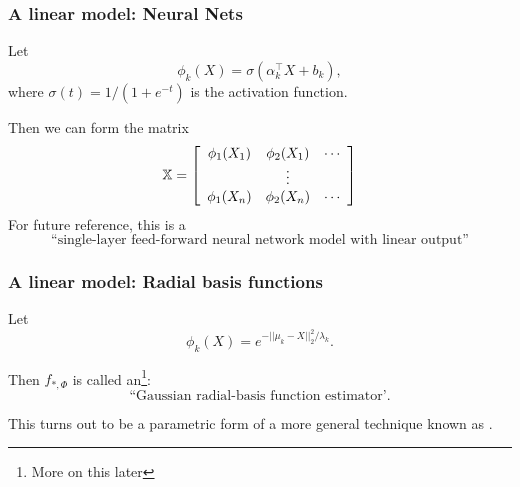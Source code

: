 \documentclass{beamer}
\begin{document}
\begin{frame}
\frametitle{A linear model: Neural Nets}
Let 
\[
\phi_k(X)  = \sigma(\alpha_k^{\top}X + b_k),
\]
where $\sigma(t) = 1/(1 + e^{-t})$ is the  activation function.
\vsp

Then we can form the  matrix
\[
\mathbb{X}
=
\left[
\begin{array}{ccc}
\phi_1(X_1) & \phi_2(X_1) & \cdots \\
& \vdots & \\
\phi_1(X_n) & \phi_2(X_n) & \cdots 
\end{array}
\right]
\]
For future reference, this is a
\[
\textrm{``single-layer feed-forward neural network model with linear output''} 
\]

\end{frame}


\begin{frame}
\frametitle{A linear model: Radial basis functions}
Let 
\[
\phi_k(X)  = e^{-||\mu_k - X||_2^2/\lambda_k}.
\]

Then $f_{*,\Phi}$ is called an\footnote{More on this later}:
\[
\textrm{``Gaussian radial-basis function estimator'}.
\]

This turns out to be a parametric form of a more general technique known as .
\end{frame}

%
%
%
% 
\end{document}

